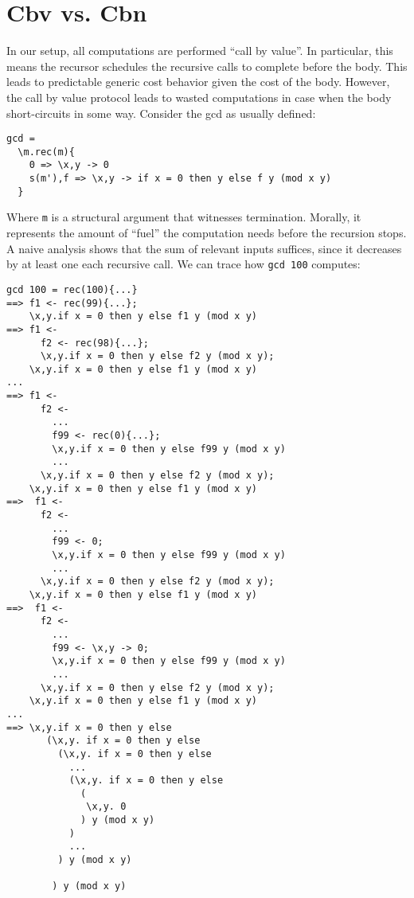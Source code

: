 \section{Cbv vs. Cbn}

In our setup, all computations are performed ``call by value''. In particular, this means
the recursor schedules the recursive calls to complete before the body. This leads to
predictable generic cost behavior given the cost of the body. However, the call by value
protocol leads to wasted computations in case when the body short-circuits in some way.
Consider the gcd as usually defined:

\begin{verbatim}
gcd = 
  \m.rec(m){
    0 => \x,y -> 0
    s(m'),f => \x,y -> if x = 0 then y else f y (mod x y)
  }
\end{verbatim}

Where \texttt{m} is a structural argument that witnesses termination. Morally, 
it represents the amount of ``fuel'' the computation needs before the recursion stops.
A naive analysis shows that the sum of relevant inputs suffices, since it decreases
by at least one each recursive call.
We can trace how \texttt{gcd 100} computes:

\begin{verbatim}
gcd 100 = rec(100){...}
==> f1 <- rec(99){...}; 
    \x,y.if x = 0 then y else f1 y (mod x y)
==> f1 <- 
      f2 <- rec(98){...};
      \x,y.if x = 0 then y else f2 y (mod x y);
    \x,y.if x = 0 then y else f1 y (mod x y)
...
==> f1 <- 
      f2 <- 
        ...
        f99 <- rec(0){...};
        \x,y.if x = 0 then y else f99 y (mod x y)
        ... 
      \x,y.if x = 0 then y else f2 y (mod x y);
    \x,y.if x = 0 then y else f1 y (mod x y)
==>  f1 <- 
      f2 <- 
        ...
        f99 <- 0;
        \x,y.if x = 0 then y else f99 y (mod x y)
        ... 
      \x,y.if x = 0 then y else f2 y (mod x y);
    \x,y.if x = 0 then y else f1 y (mod x y)
==>  f1 <- 
      f2 <- 
        ...
        f99 <- \x,y -> 0;
        \x,y.if x = 0 then y else f99 y (mod x y)
        ... 
      \x,y.if x = 0 then y else f2 y (mod x y);
    \x,y.if x = 0 then y else f1 y (mod x y)
...
==> \x,y.if x = 0 then y else 
       (\x,y. if x = 0 then y else 
         (\x,y. if x = 0 then y else
           ...
           (\x,y. if x = 0 then y else
             (
              \x,y. 0
             ) y (mod x y)
           )
           ...
         ) y (mod x y)
        
        ) y (mod x y)
\end{verbatim}

